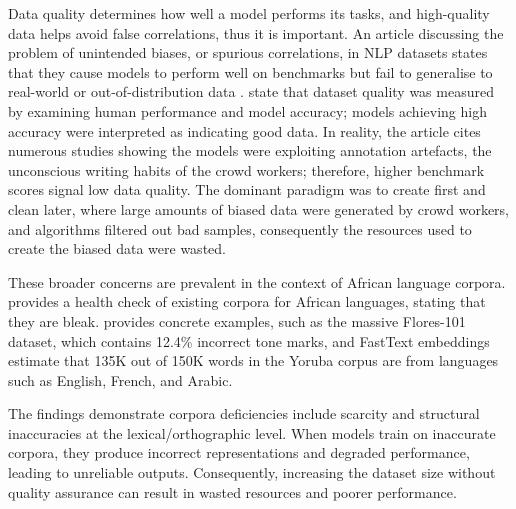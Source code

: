 \documentclass[12pt]{ThesisRU}
\begin{document}
\vspace{1em}
Data quality determines how well a model performs its tasks, and high-quality data helps avoid false correlations, thus it is important. An article discussing the problem of unintended biases, or spurious correlations, in NLP datasets states that they cause models to perform well on benchmarks but fail to generalise to real-world or out-of-distribution data \citep{Mishra2020}. \citet{Mishra2020} state that dataset quality was measured by examining human performance and model accuracy; models achieving high accuracy were interpreted as indicating good data. In reality, the article cites numerous studies showing the models were exploiting annotation artefacts, the unconscious writing habits of the crowd workers; therefore, higher benchmark scores signal low data quality. The dominant paradigm was to create first and clean later, where large amounts of biased data were generated by crowd workers, and algorithms filtered out bad samples, consequently the resources used to create the biased data were wasted. 


These broader concerns are prevalent in the context of African language corpora. \citet{Adebara2022} provides a health check of existing corpora for African languages, stating that they are bleak. \citet{Adebara2022} provides concrete examples, such as the massive Flores-101 dataset, which contains 12.4\% incorrect tone marks, and FastText embeddings estimate that 135K out of 150K words in the Yoruba corpus are from languages such as English, French, and Arabic.

The findings demonstrate corpora deficiencies include scarcity and structural inaccuracies at the lexical/orthographic level. When models train on inaccurate corpora, they produce incorrect representations and degraded performance, leading to unreliable outputs. Consequently, increasing the dataset size without quality assurance can result in wasted resources and poorer performance. 
\vspace{2em}
\end{document}
